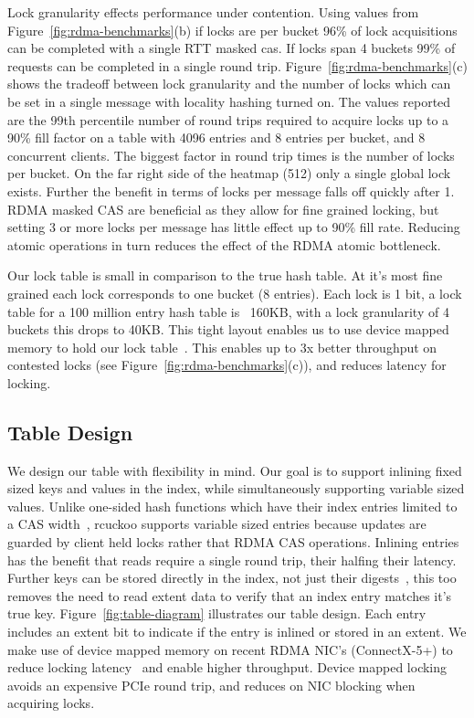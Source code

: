 Lock granularity effects performance under contention. Using
values from Figure~\ref{fig:rdma-benchmarks}(b) if locks are
per bucket 96\% of lock acquisitions can be completed with a
single RTT masked cas. If locks span 4 buckets 99\% of
requests can be completed in a single round trip.
Figure~\ref{fig:rdma-benchmarks}(c) shows the tradeoff between lock
granularity and the number of locks which can be set in a
single message with locality hashing turned on. The values
reported are the 99th percentile number of round trips
required to acquire locks up to a 90\% fill factor on a
table with 4096 entries and 8 entries per bucket, and 8
concurrent clients. The biggest factor in round trip times
is the number of locks per bucket. On the far right side of
the heatmap (512) only a single global lock exists. Further
the benefit in terms of locks per message falls off quickly
after 1. RDMA masked CAS are beneficial as they allow for
fine grained locking, but setting 3 or more locks per
message has little effect up to 90\% fill rate. Reducing
atomic operations in turn reduces the effect of the RDMA
atomic bottleneck.

Our lock table is small in comparison to the true hash
table. At it's most fine grained each lock corresponds to
one bucket (8 entries). Each lock is 1 bit, a lock table for
a 100 million entry hash table is ~160KB, with a lock
granularity of 4 buckets this drops to 40KB. This tight
layout enables us to use device mapped memory to hold our
lock table~\cite{design-guidelines,sherman}. This enables up
to 3x better throughput on contested locks (see
Figure~\ref{fig:rdma-benchmarks}(c)), and reduces latency
for locking.

\subsection{Table Design}

We design our table with flexibility in mind. Our goal is to
support inlining fixed sized keys and values in the index,
while simultaneously supporting variable sized values.
Unlike one-sided hash functions which have their index
entries limited to a CAS width~\cite{race}, rcuckoo supports
variable sized entries because updates are guarded by client
held locks rather that RDMA CAS operations. Inlining entries
has the benefit that reads require a single round trip,
their halfing their latency. Further keys can be stored
directly in the index, not just their
digests~\cite{pilaf,race}, this too removes the need to read
extent data to verify that an index entry matches it's true
key. Figure~\ref{fig:table-diagram} illustrates our table
design.  Each entry includes an extent bit to indicate if
the entry is inlined or stored in an extent. We make use of
device mapped memory on recent RDMA NIC's (ConnectX-5+) to
reduce locking latency~\cite{sherman} and enable higher
throughput. Device mapped locking avoids an expensive PCIe
round trip, and reduces on NIC blocking when acquiring
locks.


